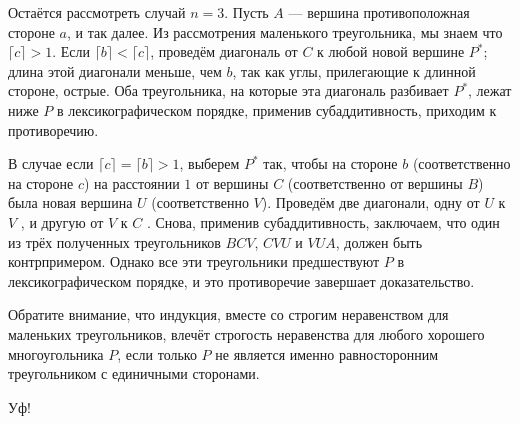 Остаётся рассмотреть случай $n=3$.
Пусть $A$ --- вершина противоположная стороне $a$, и так далее.
Из рассмотрения маленького треугольника, мы знаем что $\lceil c\rceil>1$.
Если $\lceil b\rceil<\lceil c\rceil$, проведём диагональ от $C$ к любой новой вершине $P^*$;
длина этой диагонали меньше, чем $b$, так как углы, прилегающие к длинной стороне, острые.
Оба треугольника, на которые эта диагональ разбивает $P^*$, лежат ниже $P$ в лексикографическом порядке, применив субаддитивность, приходим к противоречию.

В случае если $\lceil c\rceil=\lceil b\rceil>1$, выберем $P^*$ так, чтобы на стороне $b$ (соответственно на стороне $c$) на расстоянии $1$ от вершины $C$ (соответственно от вершины $B$) была новая вершина $U$ (соответственно $V$).
Проведём две диагонали, одну от $U$ к $V$%
, и другую от $V$ к $C$%
.
Снова, применив субаддитивность, заключаем, что один из трёх полученных треугольников $BCV$, $CVU$ и $VUA$, должен быть контрпримером.
Однако все эти треугольники предшествуют $P$ в лексикографическом порядке, и это противоречие завершает доказательство.

Обратите внимание, что индукция, вместе со строгим неравенством для маленьких треугольников, влечёт строгость неравенства для любого хорошего многоугольника $P$, если только $P$ не является именно равносторонним треугольником с единичными сторонами.

Уф!
